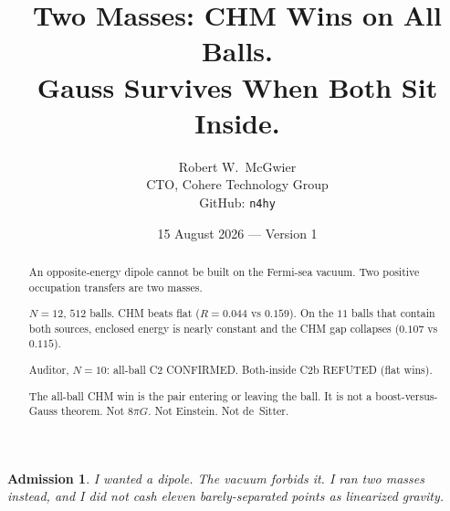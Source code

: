 \documentclass[11pt]{article}
\title{\textbf{Two Masses: CHM Wins on All Balls.\\
Gauss Survives When Both Sit Inside.}}
\author{Robert W.\ McGwier\\
\small CTO, Cohere Technology Group\\
\small GitHub: \texttt{n4hy}}
\date{15 August 2026 --- Version 1}
\newtheorem*{admission}{Admission}
\begin{document}
\maketitle

\begin{abstract}
\noindent
An opposite-energy dipole cannot be built on the Fermi-sea
vacuum. Two positive occupation transfers are two masses.

$N=12$, $512$ balls. CHM beats flat ($R=0.044$ vs $0.159$).
On the $11$ balls that contain both sources, enclosed
energy is nearly constant and the CHM gap collapses
($0.107$ vs $0.115$).

Auditor, $N=10$: all-ball C2 CONFIRMED. Both-inside C2b
REFUTED (flat wins).

The all-ball CHM win is the pair entering or leaving the
ball. It is not a boost-versus-Gauss theorem. Not $8\pi G$.
Not Einstein. Not de~Sitter.
\end{abstract}

\begin{admission}
I wanted a dipole. The vacuum forbids it. I ran two masses
instead, and I did not cash eleven barely-separated points
as linearized gravity.
\end{admission}
\end{document}
